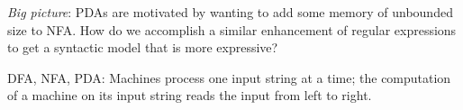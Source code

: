 \documentclass[12pt, oneside]{article}
\begin{document}
\begin{comment}
{\it Extra practice}: Consider the state diagram of a PDA with input alphabet 
$\Sigma$ and stack alphabet $\Gamma$.

\begin{center}
\begin{tabular}{|c|c|}
\hline
Label & means \\
\hline
$a, b ; c$ when $a \in \Sigma$, $b\in \Gamma$, $c \in \Gamma$ 
& \hspace{3in} \\
& \\
& \\
& \\
& \\
&\\
\hline
$a, \varepsilon ; c$ when $a \in \Sigma$, $c \in \Gamma$ 
& \hspace{3in} \\
& \\
& \\
& \\
& \\
&\\
\hline
$a, b ; \varepsilon$ when $a \in \Sigma$, $b\in \Gamma$
& \hspace{3in} \\
& \\
& \\
& \\
& \\
&\\
\hline
$a, \varepsilon ; \varepsilon$ when $a \in \Sigma$
& \hspace{3in} \\
& \\
& \\
& \\
& \\
&\\
\hline
\end{tabular}
\end{center}


How does the meaning change if $a$ is replaced by $\varepsilon$?
\end{comment}

{\it Big picture}: PDAs are motivated by wanting to add some memory of unbounded size to NFA. How 
do we accomplish a similar enhancement of regular expressions to get a syntactic model that is 
more expressive?

DFA, NFA, PDA: Machines process one input string at a time; the computation of a machine on its input string 
reads the input from left to right.
\end{document}
